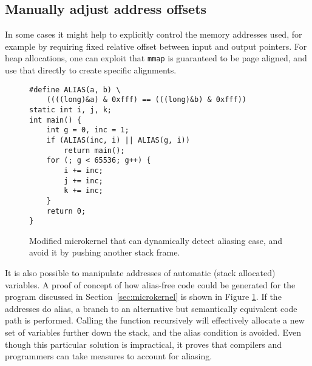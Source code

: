 \documentclass[10pt, conference, compsocconf]{IEEEtran}
\begin{document}
\subsection{Manually adjust address offsets}
In some cases it might help to explicitly control the memory addresses used, for example by requiring fixed relative offset between input and output pointers.
For heap allocations, one can exploit that \texttt{mmap} is guaranteed to be page aligned, and use that directly to create specific alignments.

\begin{figure}
  \begin{lstlisting}[frame=single, xleftmargin=.005\textwidth, xrightmargin=.005\textwidth]
#define ALIAS(a, b) \
    ((((long)&a) & 0xfff) == (((long)&b) & 0xfff))
static int i, j, k;
int main() {
    int g = 0, inc = 1;
    if (ALIAS(inc, i) || ALIAS(g, i))
        return main();
    for (; g < 65536; g++) {
        i += inc;
        j += inc;
        k += inc;
    }
    return 0;
}
  \end{lstlisting}
  \caption{Modified microkernel that can dynamically detect aliasing case, and avoid it by pushing another stack frame.}
  \label{lst:loopfixed}
\end{figure}

It is also possible to manipulate addresses of automatic (stack allocated) variables.
A proof of concept of how alias-free code could be generated for the program discussed in Section~\ref{sec:microkernel} is shown in Figure \ref{lst:loopfixed}.
If the addresses do alias, a branch to an alternative but semantically equivalent code path is performed.
Calling the function recursively will effectively allocate a new set of variables further down the stack, and the alias condition is avoided.
Even though this particular solution is impractical, it proves that compilers and programmers can take measures to account for aliasing.
\end{document}
